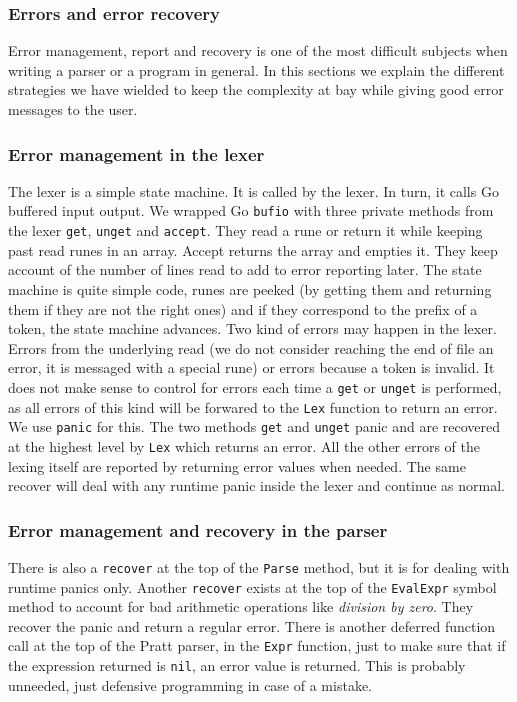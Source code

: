 \documentclass[a4paper]{article}
\begin{document}
\subsubsection{Errors and error recovery}

Error management, report and recovery is one of the most difficult
subjects when writing a parser or a program in general. In this sections
we explain the different strategies we have wielded to keep the complexity
at bay while giving good error messages to the user.


\subsubsection{Error management in the lexer}

The lexer is a simple state machine. It is called by the lexer. In turn,
it calls Go buffered input output.
We wrapped Go \verb+bufio+ with three private methods from the lexer \verb+get+, \verb+unget+ and
\verb+accept+. They read a rune or return it while keeping past read runes in
an array. Accept returns the array and empties it. They keep account of the number of lines read
to add to error reporting later. The state machine is quite simple
code, runes are peeked (by getting them and returning them if they are not the right ones)
and if they correspond to the prefix of a token, the state machine advances. Two kind of errors may
happen in the lexer. Errors from the underlying read (we do not consider reaching the end
of file an error, it is messaged with a special rune) or errors because a token is invalid.
It does not make sense to control for errors each time a \verb+get+ or \verb+unget+ is performed,
as all errors of this kind will be forwared to the \verb+Lex+ function to return an error. We use
\verb+panic+ for this.
The two methods \verb+get+ and \verb+unget+ panic and are recovered at the highest
level by \verb+Lex+ which returns an error. All the other errors of the lexing itself are
reported by returning error values when needed. The same recover will
deal with any runtime panic inside the lexer and continue as normal.

\subsubsection{Error management and recovery in the parser}

There is also a \verb+recover+ at the top of the \verb+Parse+ method, but it is for dealing with runtime
panics only. Another \verb+recover+ exists at the top of
the \verb+EvalExpr+ symbol method to account for bad
arithmetic operations like \emph{division by zero}. They recover the panic and return
a regular error.
There is another deferred function call at the top of the Pratt parser, in the \verb+Expr+ function,
just to make sure that if the expression returned is \verb+nil+, an error value is returned.
This is probably unneeded, just defensive programming in case of a mistake.
\end{document}

